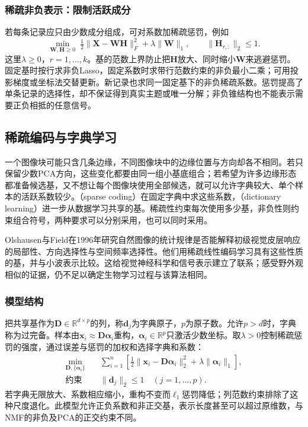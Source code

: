 \subsubsection{稀疏非负表示：限制活跃成分}

若每条记录应只由少数成分组成，可对系数加稀疏惩罚，例如
\[
 \min_{\bm W,\bm H\geq0}\;
 \tfrac12\lVert\bm X-\bm W\bm H\rVert_F^2
 +\lambda\lVert\bm W\rVert_1,
 \qquad \lVert\bm H_{r,:}\rVert_2\leq1.
\]
这里$\lambda\geq0$，$r=1,\ldots,k$。基的范数上界防止把$\bm H$放大、同时缩小$\bm W$来逃避惩罚。固定基时按行求非负Lasso，固定系数时求带行范数约束的非负最小二乘；可用投影梯度或坐标法交替更新。新记录也求同一固定基下的非负稀疏系数。惩罚提高了单条记录的选择性，却不保证得到真实主题或唯一分解；非负锥结构也不能表示需要正负相抵的任意信号。

\subsection{稀疏编码与字典学习}
\label{sec:dim-sparse-coding}

一个图像块可能只含几条边缘，不同图像块中的边缘位置与方向却各不相同。若只保留少数PCA方向，这些变化都要由同一组小基底组合；若希望为许多边缘形态都准备候选基，又不想让每个图像块使用全部候选，就可以允许字典较大、单个样本的活跃系数较少。（sparse coding）在固定字典中求这些系数，（dictionary learning）进一步从数据学习共享的基。稀疏性约束每次使用多少基，非负性则约束组合符号，两种要求可以分别采用，也可以同时采用。

Olshausen与Field在1996年研究自然图像的统计规律是否能解释初级视觉皮层响应的局部性、方向选择性与空间频率选择性。他们用稀疏线性编码学习具有这些性质的基，并与小波表示比较。这给视觉神经科学和信号表示建立了联系；感受野外观相似的证据，仍不足以确定生物学习过程与该算法相同。

\subsubsection{模型结构}
\label{sec:dim-sparse-coding-structure}

把共享基作为$\bm{D}\in\mathbb{R}^{d\times p}$的列，称$\bm{d}_j$为字典原子，$p$为原子数。允许$p>d$时，字典称为过完备。样本由$\bm{x}_i\approx\bm{D}\bm{\alpha}_i$重构，$\bm{\alpha}_i\in\mathbb{R}^{p}$只激活少数坐标。取$\lambda>0$控制稀疏惩罚的强度，通过误差与惩罚的加权和选择字典和系数：
\begin{equation}
  \begin{aligned}
  \min_{\bm{D},\{\bm{\alpha}_i\}}\quad&
   \sum_{i=1}^{n}\left[
      \tfrac12\lVert\bm{x}_i-\bm{D}\bm{\alpha}_i\rVert_2^2
      +\lambda\lVert\bm{\alpha}_i\rVert_1\right],\\
  \text{约束}\quad&\lVert\bm{d}_j\rVert_2\leq1
                 \quad(j=1,\ldots,p).
  \end{aligned}
  \label{eq:dim-dictionary-objective}
\end{equation}
若字典无限放大、系数相应缩小，重构不变而$\ell_1$惩罚降低；列范数约束排除了这种尺度退化。此模型允许正负系数和非正交基，表示长度甚至可以超过原维数，与NMF的非负及PCA的正交约束不同。

